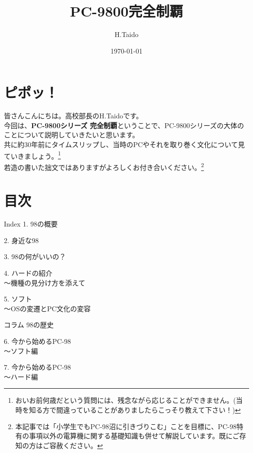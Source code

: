 \documentclass[b5paper,9pt,platex,dvipdfmx]{jsarticle}
\begin{document}
\title{PC-9800完全制覇}
\author{H.Taido}
\date{\today}
\maketitle
\thispagestyle{empty}

\begin{multicols}{3}
  
\section*{ピポッ！}
皆さんこんにちは。高校部長のH.Taidoです。\\
今回は、{\bf PC-9800シリーズ 完全制覇}ということで、PC-9800シリーズの大体のことについて説明していきたいと思います。\\共に約30年前にタイムスリップし、当時のPCやそれを取り巻く文化について見ていきましょう。\footnote{おいお前何歳だという質問には、残念ながら応じることができません。(当時を知る方で間違っていることがありましたらこっそり教えて下さい！)}\\
若造の書いた拙文ではありますがよろしくお付き合いください。\footnote{本記事では「小学生でもPC-98沼に引きづりこむ」ことを目標に、PC-98特有の事項以外の電算機に関する基礎知識も併せて解説しています。既にご存知の方はご容赦ください。}
\section*{目次}
\begin{itembox}[l]{Index}
  1. 98の概要

  2. 身近な98

  3. 98の何がいいの？

  4. ハードの紹介
  \\〜機種の見分け方を添えて

  5. ソフト
  \\〜OSの変遷とPC文化の変容

  コラム 98の歴史

  6. 今から始めるPC-98
  \\〜ソフト編

  7. 今から始めるPC-98
  \\〜ハード編


\end{itembox}
\end{multicols}
\end{document}
